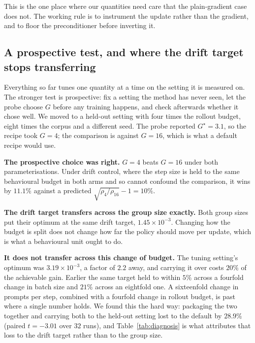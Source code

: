 This is the one place where our quantities need care that the plain-gradient case does not. The
working rule is to instrument the update rather than the gradient, and to floor the preconditioner
before inverting it.

\subsection{A prospective test, and where the drift target stops transferring}
\label{sec:recipe}

Everything so far tunes one quantity at a time on the setting it is measured on. The stronger test
is prospective: fix a setting the method has never seen, let the probe choose $G$ before any
training happens, and check afterwards whether it chose well. We moved to a held-out setting with
four times the rollout budget, eight times the corpus and a different seed. The probe reported
$G^{\star} = 3.1$, so the recipe took $G = 4$; the comparison is against $G = 16$, which is what a
default recipe would use.

\begin{table}[t]
  \centering
  \small
  
  \caption{Best achievable gain at the held-out setting, crossing the group size the probe selected
  against the group size a default recipe would use, under both ways of setting the step. Starred
  entries sit at the edge of their grid and are lower bounds. The probe's choice wins under both.}
  \label{tab:diagnosis}
\end{table}

\textbf{The prospective choice was right.} $G = 4$ beats $G = 16$ under both parameterisations.
Under drift control, where the step size is held to the same behavioural budget in both arms and so
cannot confound the comparison, it wins by $11.1\%$ against a predicted
$\sqrt{\rho_4/\rho_{16}} - 1 = 10\%$.

\textbf{The drift target transfers across the group size exactly.} Both group sizes put their
optimum at the same drift target, $1.45 \times 10^{-3}$. Changing how the budget is split does not
change how far the policy should move per update, which is what a behavioural unit ought to do.

\textbf{It does not transfer across this change of budget.} The tuning setting's optimum was
$3.19 \times 10^{-3}$, a factor of $2.2$ away, and carrying it over costs $20\%$ of the achievable
gain. Earlier the same target held to within $5\%$ across a fourfold change in batch size and
$21\%$ across an eightfold one. A sixteenfold change in prompts per step, combined with a fourfold
change in rollout budget, is past where a single number holds. We found this the hard way: packaging
the two together and carrying both to the held-out setting lost to the default by $28.9\%$ (paired
$t = -3.01$ over $32$ runs), and Table~\ref{tab:diagnosis} is what attributes that loss to the drift
target rather than to the group size.

